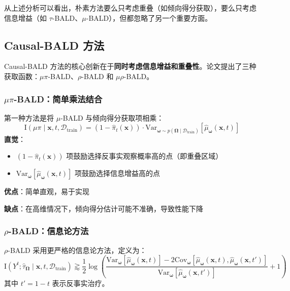 \documentclass[12pt]{article}
\begin{document}
从上述分析可以看出，朴素方法要么只考虑重叠（如倾向得分获取），要么只考虑信息增益（如 $\tau$-BALD、$\mu$-BALD），但都忽略了另一个重要方面。

\subsection{Causal-BALD 方法}

Causal-BALD 方法的核心创新在于\textbf{同时考虑信息增益和重叠性}。论文提出了三种获取函数：$\mu\pi$-BALD、$\rho$-BALD 和 $\mu\rho$-BALD。

\subsubsection{$\mu\pi$-BALD：简单乘法结合}

第一种方法是将 $\mu$-BALD 与倾向得分获取项相乘：
\begin{equation}
\text{I}(\mu\pi \mid \mathbf{x}, t, \mathcal{D}_{\text{train}}) = (1 - \hat{\pi}_t(\mathbf{x})) \cdot \text{Var}_{\boldsymbol{\omega} \sim p(\boldsymbol{\Omega} \mid \mathcal{D}_{\text{train}})}[\hat{\mu}_{\boldsymbol{\omega}}(\mathbf{x}, t)]
\end{equation}
\textbf{直觉}：
\begin{itemize}
\item $(1 - \hat{\pi}_t(\mathbf{x}))$ 项鼓励选择反事实观察概率高的点（即重叠区域）
\item $\text{Var}_{\boldsymbol{\omega}}[\hat{\mu}_{\boldsymbol{\omega}}(\mathbf{x}, t)]$ 项鼓励选择信息增益高的点
\end{itemize}
\textbf{优点}：简单直观，易于实现

\textbf{缺点}：在高维情况下，倾向得分估计可能不准确，导致性能下降

\subsubsection{$\rho$-BALD：信息论方法}

$\rho$-BALD 采用更严格的信息论方法，定义为：
\begin{equation}
\text{I}(Y^t; \hat{\tau}_{\boldsymbol{\Omega}} \mid \mathbf{x}, t, \mathcal{D}_{\text{train}}) \gtrapprox \frac{1}{2}\log\left(\frac{\text{Var}_{\boldsymbol{\omega}}[\hat{\mu}_{\boldsymbol{\omega}}(\mathbf{x}, t)] - 2\text{Cov}_{\boldsymbol{\omega}}[\hat{\mu}_{\boldsymbol{\omega}}(\mathbf{x}, t), \hat{\mu}_{\boldsymbol{\omega}}(\mathbf{x}, t')]}{\text{Var}_{\boldsymbol{\omega}}[\hat{\mu}_{\boldsymbol{\omega}}(\mathbf{x}, t')]} + 1\right)
\end{equation}
其中 $t' = 1-t$ 表示反事实治疗。
\end{document}
